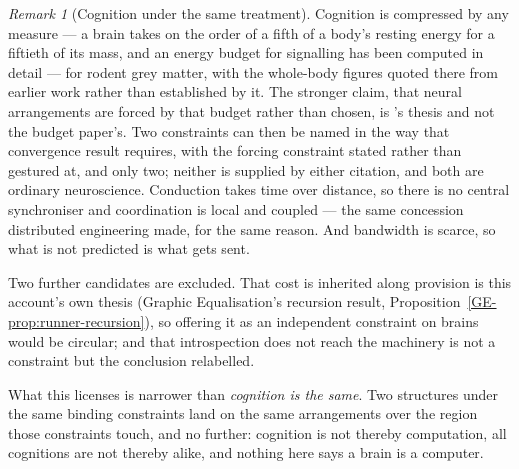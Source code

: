 \documentclass[11pt,a4paper]{article}
\theoremstyle{remark}\newtheorem{remark}[definition]{Remark}
\begin{document}
\begin{remark}[Cognition under the same treatment]\label{rem:cognition-compression}
Cognition is compressed by any measure --- a brain takes on the order of a fifth of a body's
resting energy for a fiftieth of its mass, and an energy budget for signalling has been computed in
detail \citep{attwell2001} --- for rodent grey matter, with the whole-body figures quoted there from
earlier work rather than established by it. The stronger claim, that neural arrangements are forced
by that budget rather than chosen, is \citet{sterling2015}'s thesis and not the budget paper's. Two
constraints can then be named in the way that convergence result requires, with the forcing
constraint stated rather than gestured at, and only two; neither is
supplied by either citation, and both are ordinary neuroscience. Conduction takes time over distance, so there is no central
synchroniser and coordination is local and coupled --- the same concession distributed engineering
made, for the same reason. And bandwidth is scarce, so what is not predicted is what gets sent.

Two further candidates are excluded. That cost is inherited along provision is this account's own
thesis (Graphic Equalisation's recursion result, Proposition~\ref{GE-prop:runner-recursion}), so
offering it as an independent constraint on
brains would be circular; and that introspection does not reach the machinery is not a constraint but
the conclusion relabelled.

What this licenses is narrower than \emph{cognition is the same}. Two structures under the same
binding constraints land on the same arrangements over the region those constraints touch, and no
further: cognition is not thereby computation, all cognitions are not thereby alike, and nothing here
says a brain is a computer.
\end{remark}
\end{document}
